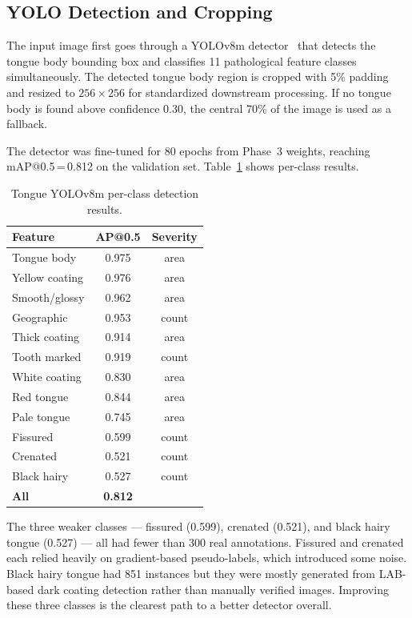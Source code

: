 \documentclass[journal]{IEEEtran}
\begin{document}
\subsection{YOLO Detection and Cropping}

The input image first goes through a YOLOv8m detector~\cite{jocher2023} that
detects the tongue body bounding box and classifies 11 pathological feature
classes simultaneously. The detected tongue body region is cropped with 5\%
padding and resized to $256 \times 256$ for standardized downstream processing.
If no tongue body is found above confidence 0.30, the central 70\% of the image
is used as a fallback.

The detector was fine-tuned for 80 epochs from Phase~3 weights, reaching
mAP@0.5\,=\,0.812 on the validation set. Table~\ref{tab:tongue_det} shows
per-class results.

\begin{table}[h]
\centering
\caption{Tongue YOLOv8m per-class detection results.}
\label{tab:tongue_det}
\begin{tabular}{lcc}
\toprule
\textbf{Feature} & \textbf{AP@0.5} & \textbf{Severity} \\
\midrule
Tongue body    & 0.975 & area  \\
Yellow coating & 0.976 & area  \\
Smooth/glossy  & 0.962 & area  \\
Geographic     & 0.953 & count \\
Thick coating  & 0.914 & area  \\
Tooth marked   & 0.919 & count \\
White coating  & 0.830 & area  \\
Red tongue     & 0.844 & area  \\
Pale tongue    & 0.745 & area  \\
Fissured       & 0.599 & count \\
Crenated       & 0.521 & count \\
Black hairy    & 0.527 & count \\
\midrule
\textbf{All}   & \textbf{0.812} & \\
\bottomrule
\end{tabular}
\end{table}

The three weaker classes --- fissured (0.599), crenated (0.521), and black
hairy tongue (0.527) --- all had fewer than 300 real annotations. Fissured
and crenated each relied heavily on gradient-based pseudo-labels, which
introduced some noise. Black hairy tongue had 851 instances but they were
mostly generated from LAB-based dark coating detection rather than manually
verified images. Improving these three classes is the clearest path to
a better detector overall.
\end{document}
